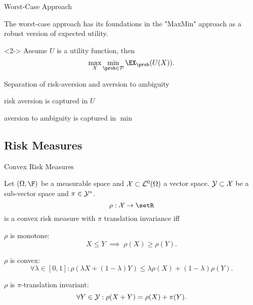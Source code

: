 







{Worst-Case Approach}






	The worst-case approach has its foundations in the "MaxMin" approach as a robust version of expected utility.

	<2-> Assume $U$ is a utility function, then
$$
\max _X \min_{\prob \in {\cal P}} \EX_{\prob}(U(X)).
$$


	Separation of risk-aversion and aversion to ambiguity






	risk aversion is captured in $U$


	aversion to ambiguity is captured in $\min$










\subsection{Risk Measures}

{Convex Risk Measures}

Let $(\Omega, \F)$ be a measurable space and ${\cal X} \subset {\cal L}^0(\Omega)$ a vector space. ${\cal Y} \subset {\cal X}$ be a sub-vector space and
$\pi \in {\cal Y}^*$.
\begin{equation}
\rho: {\cal X} \rightarrow \setR
\end{equation}
is a convex risk measure with $\pi$ translation invariance iff






	$\rho$ is monotone: $$X \leq Y \;  \implies \; \rho(X) \geq \rho(Y).$$


	$\rho$ is convex: $$\forall \lambda \in [0,1]: \rho(\lambda X + (1-\lambda) Y) \leq \lambda \rho(X) + (1-\lambda) \rho(Y).$$


	$\rho$ is $\pi$-translation invariant: $$\forall Y \in {\cal Y}: \rho(X+Y) = \rho(X) + \pi(Y).$$





